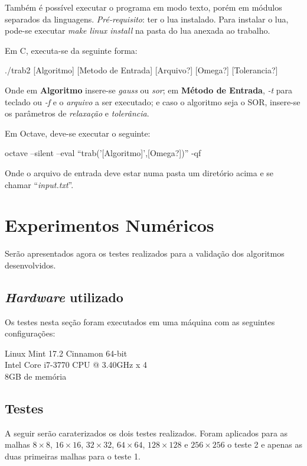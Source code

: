 \documentclass[
	11pt,				%
	oneside,			%
	a4paper,			%
	english,			%
	brazil,				%
	]{article}
\begin{document}
Também é possível executar o programa em modo texto, porém em módulos separados da linguagens. \textit{Pré-requisito}: ter o lua instalado. Para instalar o lua, pode-se executar \textit{make linux install} na pasta do lua anexada ao trabalho.

Em C, executa-se da seguinte forma:

./trab2 [Algoritmo] [Metodo de Entrada] [Arquivo?] [Omega?] [Tolerancia?]

Onde em \textbf{Algoritmo} insere-se \textit{gauss} ou \textit{sor}; em \textbf{Método de Entrada}, \textit{-t} para teclado ou \textit{-f} e o \textit{arquivo} a ser executado; e caso o algoritmo seja o SOR, insere-se os parâmetros de \textit{relaxação} e \textit{tolerância}.

Em Octave, deve-se executar o seguinte:

octave --silent --eval ``trab('[Algoritmo]',[Omega?])'' -qf

Onde o arquivo de entrada deve estar numa pasta um diretório acima e se chamar ``\textit{input.txt}''.

\section{Experimentos Numéricos}
Serão apresentados agora os testes realizados para a validação dos algoritmos desenvolvidos.

\subsection{\textit{Hardware} utilizado}
Os testes nesta seção foram executados em uma máquina com as seguintes configurações:

Linux Mint 17.2 Cinnamon 64-bit \\
\indent Intel Core i7-3770 CPU @ 3.40GHz x 4 \\
\indent 8GB de memória

\subsection{Testes}
A seguir serão caraterizados os dois testes realizados. Foram aplicados para as malhas $8 \times 8$, $16 \times 16$, $32 \times 32$, $64 \times 64$, $128 \times 128$ e $256 \times 256$ o teste 2 e apenas as duas primeiras malhas para o teste 1.
\end{document}
